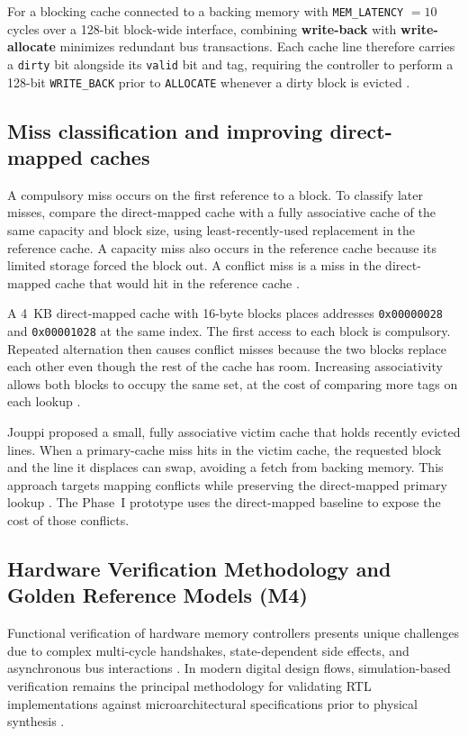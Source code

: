 \documentclass[conference]{IEEEtran}
\begin{document}
For a blocking cache connected to a backing memory with \texttt{MEM\_LATENCY} $= 10$ cycles over a 128-bit block-wide interface, combining \textbf{write-back} with \textbf{write-allocate} minimizes redundant bus transactions. Each cache line therefore carries a \texttt{dirty} bit alongside its \texttt{valid} bit and tag, requiring the controller to perform a 128-bit \texttt{WRITE\_BACK} prior to \texttt{ALLOCATE} whenever a dirty block is evicted \cite{hennessy2019computer}.

\subsection{Miss classification and improving direct-mapped caches}
A compulsory miss occurs on the first reference to a block. To classify later misses, compare the direct-mapped cache with a fully associative cache of the same capacity and block size, using least-recently-used replacement in the reference cache. A capacity miss also occurs in the reference cache because its limited storage forced the block out. A conflict miss is a miss in the direct-mapped cache that would hit in the reference cache \cite{patterson2020computer}.

A 4~KB direct-mapped cache with 16-byte blocks places addresses \texttt{0x00000028} and \texttt{0x00001028} at the same index. The first access to each block is compulsory. Repeated alternation then causes conflict misses because the two blocks replace each other even though the rest of the cache has room. Increasing associativity allows both blocks to occupy the same set, at the cost of comparing more tags on each lookup \cite{hill1988case}.

Jouppi proposed a small, fully associative victim cache that holds recently evicted lines. When a primary-cache miss hits in the victim cache, the requested block and the line it displaces can swap, avoiding a fetch from backing memory. This approach targets mapping conflicts while preserving the direct-mapped primary lookup \cite{jouppi1990improving}. The Phase~I prototype uses the direct-mapped baseline to expose the cost of those conflicts.

\subsection{Hardware Verification Methodology and Golden Reference Models (M4)}
Functional verification of hardware memory controllers presents unique challenges due to complex multi-cycle handshakes, state-dependent side effects, and asynchronous bus interactions \cite{hennessy2019computer, patterson2020computer}. In modern digital design flows, simulation-based verification remains the principal methodology for validating RTL implementations against microarchitectural specifications prior to physical synthesis \cite{patterson2020computer}.
\end{document}
